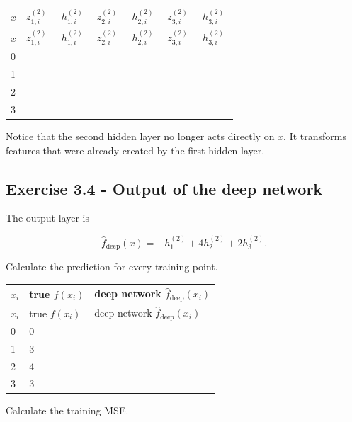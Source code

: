 \documentclass{course_sheet}
\begin{document}
\begingroup
\small
\setlength{\tabcolsep}{4pt}
\begin{longtable}{l|l|l|l|l|l|l}
$x$ & $z^{(2)}_{1,i}$ & $h^{(2)}_{1,i}$ & $z^{(2)}_{2,i}$ & $h^{(2)}_{2,i}$ & $z^{(2)}_{3,i}$ & $h^{(2)}_{3,i}$ \\[1.5pt]
\hline
\endfirsthead
$x$ & $z^{(2)}_{1,i}$ & $h^{(2)}_{1,i}$ & $z^{(2)}_{2,i}$ & $h^{(2)}_{2,i}$ & $z^{(2)}_{3,i}$ & $h^{(2)}_{3,i}$ \\[1.5pt]
\hline
\endhead
\rule{0pt}{2.4ex}0 &  $\phantom{-0.00}$ &  $\phantom{-0.00}$ &  $\phantom{-0.00}$ &  $\phantom{-0.00}$ &  $\phantom{-0.00}$ &  $\phantom{-0.00}$ \\[3pt]
\rule{0pt}{2.4ex}1 &  $\phantom{-0.00}$ &  $\phantom{-0.00}$ &  $\phantom{-0.00}$ &  $\phantom{-0.00}$ &  $\phantom{-0.00}$ &  $\phantom{-0.00}$ \\[3pt]
\rule{0pt}{2.4ex}2 &  $\phantom{-0.00}$ &  $\phantom{-0.00}$ &  $\phantom{-0.00}$ &  $\phantom{-0.00}$ &  $\phantom{-0.00}$ &  $\phantom{-0.00}$ \\[3pt]
\rule{0pt}{2.4ex}3 &  $\phantom{-0.00}$ &  $\phantom{-0.00}$ &  $\phantom{-0.00}$ &  $\phantom{-0.00}$ &  $\phantom{-0.00}$ &  $\phantom{-0.00}$ \\[3pt]
\end{longtable}
\endgroup
Notice that the second hidden layer no longer acts directly on $x$. It transforms features that were already created by the first hidden layer.

\subsection*{Exercise 3.4 - Output of the deep network}
The output layer is

\[
\hat f_{\mathrm{deep}}(x)=-h^{(2)}_1+4h^{(2)}_2+2h^{(2)}_3.
\]

Calculate the prediction for every training point.

\begingroup
\small
\setlength{\tabcolsep}{4pt}
\begin{longtable}{l|l|l}
$x_i$ & true $f(x_i)$ & deep network $\hat f_{\mathrm{deep}}(x_i)$ \\[1.5pt]
\hline
\endfirsthead
$x_i$ & true $f(x_i)$ & deep network $\hat f_{\mathrm{deep}}(x_i)$ \\[1.5pt]
\hline
\endhead
\rule{0pt}{2.4ex}0 & 0 &  $\phantom{-0.00}$ \\[3pt]
\rule{0pt}{2.4ex}1 & 3 &  $\phantom{-0.00}$ \\[3pt]
\rule{0pt}{2.4ex}2 & 4 &  $\phantom{-0.00}$ \\[3pt]
\rule{0pt}{2.4ex}3 & 3 &  $\phantom{-0.00}$ \\[3pt]
\end{longtable}
\endgroup
Calculate the training MSE.
\end{document}
